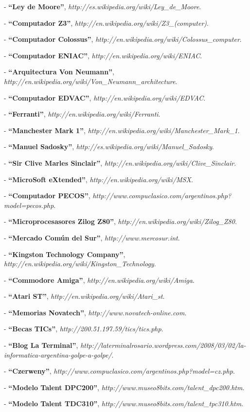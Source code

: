 \documentclass[%
  	final,
%
	notitlepage,
	narroweqnarray,
	inline,
 	twoside,
	]{ieee}
\newcommand{\link}[1]{\textit{#1}}
\newcommand{\ibiblio}[3]{
	\uppercase{#1} - \textbf{``#2''}, \link{#3}.
}
\begin{document}
\begin{thebibliography}{1}
\begin{quote} \end{quote}
 \ibiblio{}{Ley de Moore}{http://es.wikipedia.org/wiki/Ley\_de\_Moore}
 \ibiblio{}{Computador Z3}{http://en.wikipedia.org/wiki/Z3\_(computer)}
\ibiblio{}{Computador Colossus}{http://en.wikipedia.org/wiki/Colossus\_computer}
 \ibiblio{}{Computador ENIAC}{http://en.wikipedia.org/wiki/ENIAC}
 \ibiblio{}{Arquitectura Von Neumann}{http://en.wikipedia.org/wiki/Von\_Neumann\_architecture}
 \ibiblio{}{Computador EDVAC}{http://en.wikipedia.org/wiki/EDVAC}
 \ibiblio{}{Ferranti}{http://en.wikipedia.org/wiki/Ferranti}
 \ibiblio{}{Manchester Mark 1}{http://en.wikipedia.org/wiki/Manchester\_Mark\_1}
 \ibiblio{}{Manuel Sadosky}{http://es.wikipedia.org/wiki/Manuel\_Sadosky}
 \ibiblio{}{Sir Clive Marles Sinclair}{http://en.wikipedia.org/wiki/Clive\_Sinclair}
 \ibiblio{}{MicroSoft eXtended}{http://en.wikipedia.org/wiki/MSX}
 \ibiblio{}{Computador PECOS}{http://www.compuclasico.com/argentinos.php?model=pecos.php}
 \ibiblio{}{Microprocesasores Zilog Z80}{http://en.wikipedia.org/wiki/Zilog\_Z80}
 \ibiblio{}{Mercado Com\'un del Sur}{http://www.mercosur.int}
 \ibiblio{}{Kingston Technology Company}{http://en.wikipedia.org/wiki/Kingston\_Technology}
 \ibiblio{}{Commodore Amiga}{http://en.wikipedia.org/wiki/Amiga}
 \ibiblio{}{Atari ST}{http://en.wikipedia.org/wiki/Atari\_st}
\ibiblio{}{Memorias Novatech}{http://www.novatech-online.com}
 \ibiblio{}{Becas TICs}{http://200.51.197.59/tics/tics.php}
\ibiblio{}{Blog La Terminal}{http://laterminalrosario.wordpress.com/2008/03/02/la-informatica-argentina-golpe-a-golpe/}
\ibiblio{}{Czerweny}{http://www.compuclasico.com/argentinos.php?model=cz.php}
\ibiblio{}{Modelo Talent DPC200}{http://www.museo8bits.com/talent\_dpc200.htm}
\ibiblio{}{Modelo Talent TDC310}{http://www.museo8bits.com/talent\_tpc310.htm}
\end{thebibliography}

\end{document}
